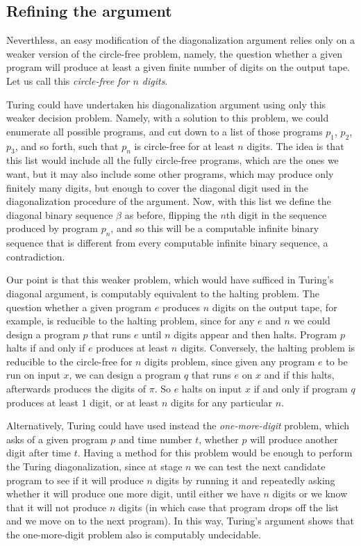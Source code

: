 \documentclass[12pt]{amsart}
\begin{document}
\subsection{Refining the argument}

Neverthless, an easy modification of the diagonalization argument relies only on a weaker version of the circle-free problem, namely, the question whether a given program will produce at least a given finite number of digits on the output tape. Let us call this \emph{circle-free for $n$ digits}. 

Turing could have undertaken his diagonalization argument using only this weaker decision problem. Namely, with a solution to this problem, we could enumerate all possible programs, and cut down to a list of those programs $p_1$, $p_2$, $p_3$, and so forth, such that $p_n$ is circle-free for at least $n$ digits. The idea is that this list would include all the fully circle-free programs, which are the ones we want, but it may also include 
some other programs, which may produce only finitely many digits, but enough to cover the diagonal digit used in the diagonalization procedure of the argument. Now, with this list we define the diagonal binary sequence $\beta$ as before, flipping the $n$th digit in the sequence produced by program $p_n$, and so this will be a computable infinite binary sequence that is different from every computable infinite binary sequence, a contradiction. 

Our point is that this weaker problem, which would have sufficed in Turing's diagonal argument, is computably equivalent to the halting problem. The question whether a given program $e$ produces $n$ digits on the output tape, for example, is reducible to the halting problem, since for any $e$ and $n$ we could design a program $p$ that runs $e$ until $n$ digits appear and then halts. Program $p$ halts if and only if $e$ produces at least $n$ digits. Conversely, the halting problem is reducible to the circle-free for $n$ digits problem, since given any program $e$ to be run on input $x$, we can design a program $q$ that runs $e$ on $x$ and if this halts, afterwards produces the digits of $\pi$. So $e$ halts on input $x$ if and only if program $q$ produces at least $1$ digit, or at least $n$ digits for any particular $n$.

Alternatively, Turing could have used instead the \emph{one-more-digit} problem, which asks of a given program $p$ and time number $t$, whether $p$ will produce another digit after time $t$. Having a method for this problem would be enough to perform the Turing diagonalization, since at stage $n$ we can test the next candidate program to see if it will produce $n$ digits by running it and repeatedly asking whether it will produce one more digit, until either we have $n$ digits or we know that it will not produce $n$ digits (in which case that program drops off the list and we move on to the next program). In this way, Turing's argument shows that the one-more-digit problem also is computably undecidable.
\end{document}

